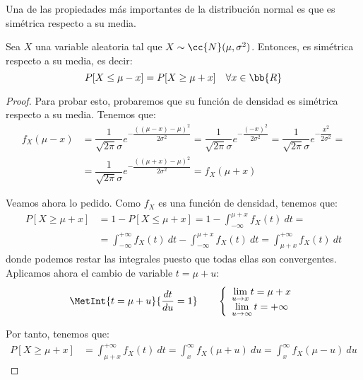 Una de las propiedades más importantes de la distribución normal es que es simétrica respecto a su media.
\begin{prop}
    Sea $X$ una variable aleatoria tal que $X\sim \cc{N}(\mu,\sigma^2)$. Entonces, es simétrica respecto a su media, es decir:
    \begin{equation*}
        P[X\leq \mu-x] = P[X\geq \mu+x] \quad \forall x\in \bb{R}
    \end{equation*}
\end{prop}
\begin{proof}
    Para probar esto, probaremos que su función de densidad es simétrica respecto a su media.
    Tenemos que:
    \begin{align*}
        f_X(\mu-x) &= \dfrac{1}{\sqrt{2\pi}\sigma} e^{-\dfrac{((\mu-x)-\mu)^2}{2\sigma^2}}
        = \dfrac{1}{\sqrt{2\pi}\sigma} e^{-\dfrac{(-x)^2}{2\sigma^2}}
        = \dfrac{1}{\sqrt{2\pi}\sigma} e^{-\dfrac{x^2}{2\sigma^2}}
        =\\&= \dfrac{1}{\sqrt{2\pi}\sigma} e^{-\dfrac{((\mu+x)-\mu)^2}{2\sigma^2}}
        = f_X(\mu+x)
    \end{align*}

    Veamos ahora lo pedido. Como $f_X$ es una función de densidad, tenemos que:
    \begin{align*}
        P[X\geq \mu+x] &= 1-P[X\leq \mu+x] = 1-\int_{-\infty}^{\mu+x} f_X(t)~dt
        =\\&= \int_{-\infty}^{+\infty} f_X(t)~dt - \int_{-\infty}^{\mu+x} f_X(t)~dt
        = \int_{\mu+x}^{+\infty} f_X(t)~dt
    \end{align*}
    donde podemos restar las integrales puesto que todas ellas son convergentes.
    Aplicamos ahora el cambio de variable $t=\mu+u$:
    \begin{equation*}
        \MetInt{t=\mu+u}{\dfrac{dt}{du} = 1} \qquad \left\{
            \begin{array}{l}
                \lim\limits_{u\to x} t = \mu+x \\
                \lim\limits_{u\to \infty} t = +\infty
            \end{array}
        \right.
    \end{equation*}

    Por tanto, tenemos que:
    \begin{align*}
        P[X\geq \mu+x] &= \int_{\mu+x}^{+\infty} f_X(t)~dt
        = \int_{x}^{\infty} f_X(\mu+u)~du
        = \int_{x}^{\infty} f_X(\mu-u)~du
    \end{align*}
    

\end{proof}
